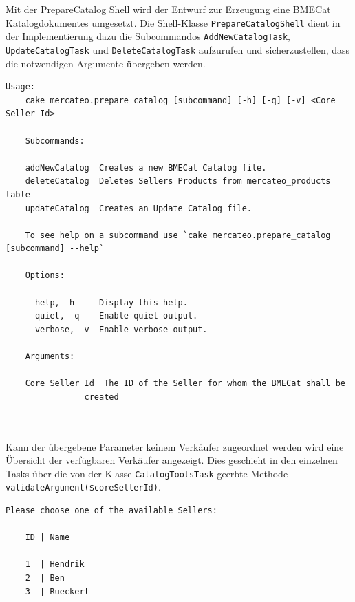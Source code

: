 	Mit der PrepareCatalog Shell wird der Entwurf zur Erzeugung eine BMECat Katalogdokumentes umgesetzt. Die Shell-Klasse \texttt{PrepareCatalogShell} dient in der Implementierung  dazu die Subcommandos \texttt{AddNewCatalogTask}, \texttt{UpdateCatalogTask} und \texttt{DeleteCatalogTask} aufzurufen und sicherzustellen, dass die notwendigen Argumente übergeben werden.\\
	\lstset{basicstyle=\scriptsize\ttfamily,language=xml}
	\begin{lstlisting}[caption={Konsolenausgabe bei Aufruf der PrepareCatalogShell}]
	Usage:
	cake mercateo.prepare_catalog [subcommand] [-h] [-q] [-v] <Core Seller Id>
	
	Subcommands:
	
	addNewCatalog  Creates a new BMECat Catalog file.
	deleteCatalog  Deletes Sellers Products from mercateo_products table
	updateCatalog  Creates an Update Catalog file.
	
	To see help on a subcommand use `cake mercateo.prepare_catalog [subcommand] --help`
	
	Options:
	
	--help, -h     Display this help.
	--quiet, -q    Enable quiet output.
	--verbose, -v  Enable verbose output.
	
	Arguments:
	
	Core Seller Id  The ID of the Seller for whom the BMECat shall be
	            created

	
	\end{lstlisting}
	
	Kann der übergebene Parameter keinem Verkäufer zugeordnet werden wird eine Übersicht der verfügbaren Verkäufer angezeigt. Dies geschieht in den einzelnen Tasks über die von der Klasse \texttt{CatalogToolsTask} geerbte Methode \texttt{validateArgument(\$coreSellerId)}.\\
	
	\begin{lstlisting}[caption={Auflistung der verfügbaren Verkäufer}]
	Please choose one of the available Sellers:
	
	ID | Name
	
	1  | Hendrik
	2  | Ben
	3  | Rueckert
	\end{lstlisting}
	
